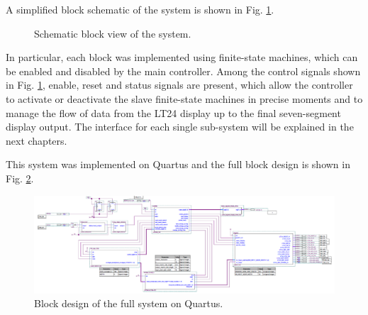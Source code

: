 \documentclass[11pt]{report}
\begin{document}
A simplified block schematic of the system is shown in Fig. \ref{fig:system_block_schem}.

\begin{figure}[!ht]
\centering
{}%
\caption{Schematic block view of the system.}
\label{fig:system_block_schem}
\end{figure}

In particular, each block was implemented using finite-state machines, which can be enabled and disabled by the main controller. Among the control signals shown in Fig. \ref{fig:system_block_schem}, enable, reset and status signals are present, which allow the controller to activate or deactivate the slave finite-state machines in precise moments and to manage the flow of data from the LT24 display up to the final seven-segment display output. The interface for each single sub-system will be explained in the next chapters.

This system was implemented on Quartus and the full block design is shown in Fig. \ref{fig:quartus_full_system}.

\begin{figure}[!ht]
    \centering
    \includegraphics[width=1.0\linewidth]{images/system_architecture/quartus_full_system.png}
    \caption{Block design of the full system on Quartus.}
    \label{fig:quartus_full_system}
\end{figure}
\end{document}
